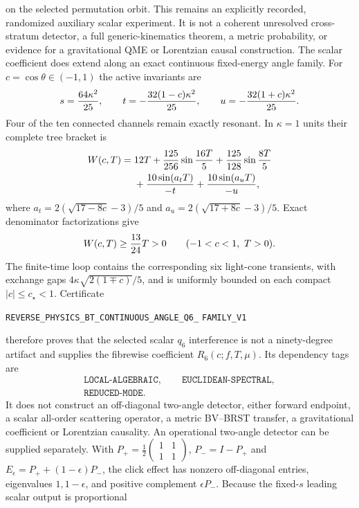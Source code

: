 \documentclass[11pt]{article}
\theoremstyle{definition}
\theoremstyle{remark}
\begin{document}
on the selected permutation orbit.  This remains an explicitly recorded,
randomized auxiliary scalar experiment.  It is not a coherent unresolved
cross-stratum detector, a full generic-kinematics theorem, a metric
probability, or evidence for a gravitational QME or Lorentzian causal
construction.
The scalar coefficient does extend along an exact continuous fixed-energy
angle family.  For $c=\cos\theta\in(-1,1)$ the active invariants are
\[
 s={64\kappa^2\over25},\qquad
 t=-{32(1-c)\kappa^2\over25},\qquad
 u=-{32(1+c)\kappa^2\over25}.
\]
Four of the ten connected channels remain exactly resonant.  In
$\kappa=1$ units their complete tree bracket is
\[
 \begin{split}
 W(c,T)={}&12T+{125\over256}\sin{16T\over5}
 +{125\over128}\sin{8T\over5}\\
 &+{10\sin(a_tT)\over-t}+{10\sin(a_uT)\over-u},
 \end{split}
\]
where $a_t=2(\sqrt{17-8c}-3)/5$ and
$a_u=2(\sqrt{17+8c}-3)/5$.  Exact denominator factorizations give
\[
 W(c,T)\geq {13\over24}T>0
 \qquad(-1<c<1,\ T>0).
\]
The finite-time loop contains the corresponding six light-cone transients,
with exchange gaps $4\kappa\sqrt{2(1\mp c)}/5$, and is uniformly bounded on
each compact $|c|\leq c_\star<1$.  Certificate
\par\noindent
\texttt{REVERSE\_PHYSICS\_BT\_CONTINUOUS\_ANGLE\_Q6\_}
\allowbreak\texttt{FAMILY\_V1}
\par\noindent
therefore proves that the selected scalar $q_6$ interference is not a
ninety-degree artifact and supplies the fibrewise coefficient
$R_6(c;f,T,\mu)$.  Its dependency tags are
\[
 \begin{gathered}
 \texttt{LOCAL-ALGEBRAIC},\qquad \texttt{EUCLIDEAN-SPECTRAL},\\
 \texttt{REDUCED-MODE}.
 \end{gathered}
\]
It does not construct an off-diagonal two-angle detector, either forward
endpoint, a scalar all-order scattering operator, a metric BV--BRST transfer,
a gravitational coefficient or Lorentzian causality.
An operational two-angle detector can be supplied separately.  With
$P_+=\frac12\left(\begin{smallmatrix}1&1\\1&1\end{smallmatrix}\right)$,
$P_-=I-P_+$ and
$E_\epsilon=P_++(1-\epsilon)P_-$, the click effect has nonzero off-diagonal
entries, eigenvalues $1,1-\epsilon$, and positive complement
$\epsilon P_-$.  Because the fixed-$s$ leading scalar output is proportional
\end{document}
